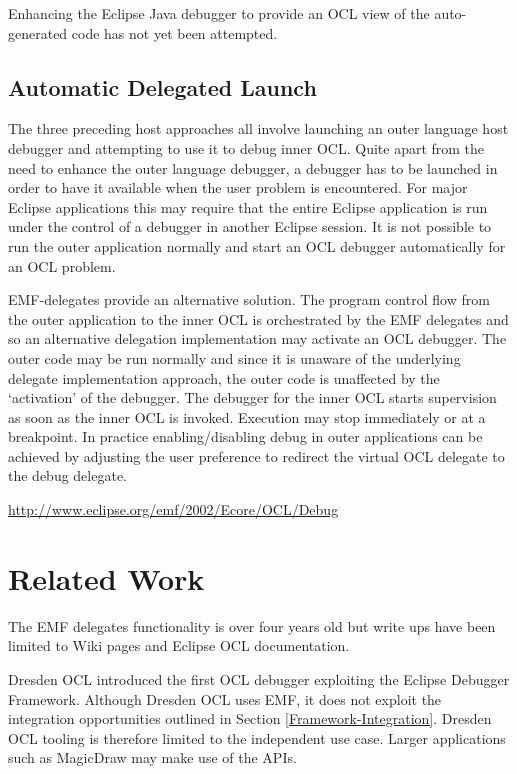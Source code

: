 \documentclass[a4paper]{article}
\begin{document}
Enhancing the Eclipse Java debugger to provide an OCL view of the auto-generated code has not yet been attempted.

\subsection{Automatic Delegated Launch}\label{DelegatedLaunch}

The three preceding host approaches all involve launching an outer language host debugger and attempting to use it to debug inner OCL. Quite apart from the need to enhance the outer language debugger, a debugger has to be launched in order to have it available when the user problem is encountered. For major Eclipse applications this may require that the entire Eclipse application is run under the control of a debugger in another Eclipse session. It is not possible to run the outer application normally and start an OCL debugger automatically for an OCL problem.

EMF-delegates provide an alternative solution. The program control flow from the outer application to the inner OCL is orchestrated by the EMF delegates and so an alternative delegation implementation may activate an OCL debugger. The outer code may be run normally and since it is unaware of the underlying delegate implementation approach, the outer code is unaffected by the `activation' of the debugger. The debugger for the inner OCL starts supervision as soon as the inner OCL is invoked. Execution may stop immediately or at a breakpoint. In practice enabling/disabling debug in outer applications can be achieved by adjusting the user preference to redirect the virtual OCL delegate to the debug delegate.

\url{http://www.eclipse.org/emf/2002/Ecore/OCL/Debug}

\section{Related Work}\label{Related-Work}

The EMF delegates functionality is over four years old but write ups have been limited to Wiki pages\cite{OCLinEcore} and Eclipse OCL documentation.

Dresden OCL\cite{DresdenOCL-Debug} introduced the first OCL debugger exploiting the Eclipse Debugger Framework. Although Dresden OCL uses EMF, it does not exploit the integration opportunities outlined in Section \ref{Framework-Integration}. Dresden OCL tooling is therefore limited to the independent use case. Larger applications such as MagicDraw may make use of the APIs.
\end{document}
